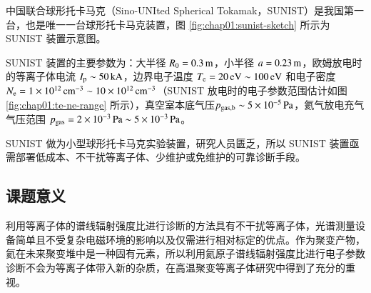 中国联合球形托卡马克（Sino-UNIted Spherical Tokamak，SUNIST）是我国第一台，也是唯一一台球形托卡马克装置\cite{Heyexi2002:SUNIST}，图 \ref{fig:chap01:sunist-sketch} 所示为 SUNIST 装置示意图。

SUNIST 装置的主要参数为：大半径 $R_0=0.3\,{\rm m}$，小半径 $a=0.23\,{\rm m}$，欧姆放电时的等离子体电流 $I_{\rm p}\sim50\,{\rm kA}$，边界电子温度 $T_{\rm e}=20\,{\rm eV}\sim100\,{\rm eV}$ 和电子密度 $N_{\rm e}=1\times10^{12}\,{\rm cm}^{-3}\sim10\times10^{12}\,{\rm cm}^{-3}$\cite{WangWH2005:PPCF:Edge}（SUNIST 放电时的电子参数范围估计如图 \ref{fig:chap01:te-ne-range} 所示），真空室本底气压$p_{\rm gas,b}\sim5\times10^{-5}\,{\rm Pa}$，氦气放电充气气压范围 $p_{\rm gas}=2\times10^{-3}\,{\rm Pa}\sim5\times10^{-3}\,{\rm Pa}$。

SUNIST 做为小型球形托卡马克实验装置，研究人员匮乏，所以 SUNIST 装置亟需部署低成本、不干扰等离子体、少维护或免维护的可靠诊断手段。

%
%
%

\subsection{课题意义}
\label{sec:ketiyiyi}

利用等离子体的谱线辐射强度比进行诊断的方法具有不干扰等离子体，光谱测量设备简单且不受复杂电磁环境的影响以及仅需进行相对标定的优点。作为聚变产物，氦在未来聚变堆中是一种固有元素，所以利用氦原子谱线辐射强度比进行电子参数诊断不会为等离子体带入新的杂质，在高温聚变等离子体研究中得到了充分的重视。

